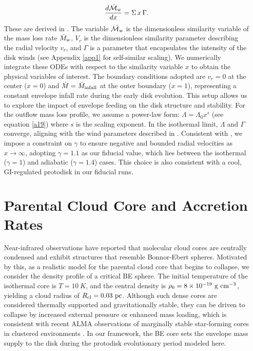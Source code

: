 \documentclass[twocolumn,linenumbers]{aastex631}
\begin{document}
\begin{equation}
\frac{d\dot{\mathcal{M}}_{\rm w}}{dx} = \Sigma\,  x\, \Gamma.
\label{eq:main_mu_capital}
\end{equation}
These are derived in \citet{abbassi2013viscous}. The variable $\dot{\mathcal{M}_{\rm w}}$ is the dimensionless similarity variable of the mass loss rate $\dot{M}_{\rm w}$, $V_{r}$ is the dimensionless similarity parameter describing the radial velocity $v_{r}$, and $\Gamma$ is a parameter that encapsulates the intensity of the disk winds (see Appendix \ref{app1} for self-similar scaling). We numerically integrate these ODEs with respect to the similarity variable $x$ to obtain the physical variables of interest.
The boundary conditions adopted are $v_{r}=0$ at the center ($x=0$) and $\dot{M}=\dot{M}_{\rm infall}$ at the outer boundary ($x=1$), representing a constant envelope infall rate during the early disk evolution. This setup allows us to explore the impact of envelope feeding on the disk structure and stability. For the outflow mass loss profile, we assume a power-law form: $\Lambda =\Lambda_{0} x^{s}$ (see equation \ref{a19}) where $s$ is the scaling exponent. In the isothermal limit, $\Lambda$ and $\Gamma$ converge, aligning with the wind parameters described in \citet{shadmehri2009influence}. Consistent with \citet{mineshige1997self}, we impose a constraint on $\gamma$ to ensure negative and bounded radial velocities as $x \rightarrow \infty$, adopting $\gamma=1.1$ as our fiducial value, which lies between the isothermal ($\gamma=1$) and adiabatic ($\gamma=1.4$) cases. This choice is also consistent with a cool, GI-regulated protodisk in our fiducial runs.



\section{Parental Cloud Core and Accretion Rates}\label{accrate}

Near-infrared observations \citep[e.g.,][]{alves2001internal,schnee2005density} have reported that molecular cloud cores are centrally condensed and exhibit structures that resemble Bonnor-Ebert \citep[BE;][]{bonnor1956mnras,ebert1955temperatur} spheres. Motivated by this, as a realistic model for the parental cloud core that begins to collapse, we consider the density profile of a critical BE sphere. %
The initial temperature of the isothermal core is $T = 10~K$, and the central density is $\rho_{\rm 0} = 8 \times 10^{-19}~{\rm g~cm^{-3}}$, yielding a cloud radius of $R_{\rm cl} = 0.03~{\rm pc}$. Although such dense cores are considered thermally supported and gravitationally stable, they can be driven to collapse by increased external pressure or enhanced mass loading, which is consistent with recent ALMA observations of marginally stable star-forming cores in clustered environments \citep{chen2024dynamics}. In our framework, the BE core sets the envelope mass supply to the disk during the protodisk evolutionary period modeled here.
\end{document}
